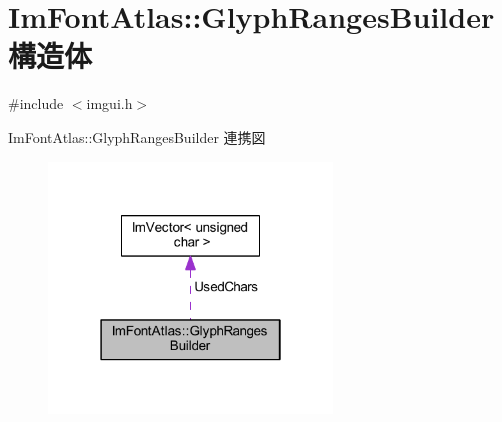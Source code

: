 \hypertarget{struct_im_font_atlas_1_1_glyph_ranges_builder}{}\section{Im\+Font\+Atlas\+:\+:Glyph\+Ranges\+Builder 構造体}
\label{struct_im_font_atlas_1_1_glyph_ranges_builder}


{\ttfamily \#include $<$imgui.\+h$>$}



Im\+Font\+Atlas\+:\+:Glyph\+Ranges\+Builder 連携図\nopagebreak
\begin{figure}[H]
\begin{center}
\leavevmode
\includegraphics[width=214pt]{struct_im_font_atlas_1_1_glyph_ranges_builder__coll__graph}
\end{center}
\end{figure}

